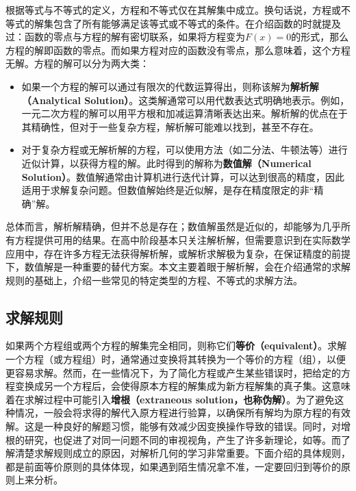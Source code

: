 
根据等式与不等式的定义，方程和不等式仅在其解集中成立。换句话说，方程或不等式的解集包含了所有能够满足该等式或不等式的条件。在介绍函数的时就提及过：函数的零点与方程的解有密切联系，如果将方程变为$F(x)=0$的形式，那么方程的解即函数的零点。而如果方程对应的函数没有零点，那么意味着，这个方程无解。方程的解可以分为两大类：

\begin{itemize}
\item 如果一个方程的解可以通过有限次的代数运算得出，则称该解为\textbf{解析解（Analytical Solution）}。这类解通常可以用代数表达式明确地表示。例如，一元二次方程的解可以用平方根和加减运算清晰表达出来。解析解的优点在于其精确性，但对于一些复杂方程，解析解可能难以找到，甚至不存在。
\item 对于复杂方程或无解析解的方程，可以使用方法（如二分法、牛顿法等）进行近似计算，以获得方程的解。此时得到的解称为\textbf{数值解（Numerical Solution）}。数值解通常由计算机进行迭代计算，可以达到很高的精度，因此适用于求解复杂问题。但数值解始终是近似解，是存在精度限定的非“精确”解。
\end{itemize}

总体而言，解析解精确，但并不总是存在；数值解虽然是近似的，却能够为几乎所有方程提供可用的结果。在高中阶段基本只关注解析解，但需要意识到在实际数学应用中，存在许多方程无法获得解析解，或解析求解极为复杂，在保证精度的前提下，数值解是一种重要的替代方案。本文主要着眼于解析解，会在介绍通常的求解规则的基础上，介绍一些常见的特定类型的方程、不等式的求解方法。

\subsection{求解规则}

如果两个方程组或两个方程的解集完全相同，则称它们\textbf{等价（equivalent）}。求解一个方程（或方程组）时，通常通过变换将其转换为一个等价的方程（组），以便更容易求解。然而，在一些情况下，为了简化方程或产生某些错误时，把给定的方程变换成另一个方程后，会使得原本方程的解集成为新方程解集的真子集。这意味着在求解过程中可能引入\textbf{增根（extraneous solution，也称伪解）}。为了避免这种情况，一般会将求得的解代入原方程进行验算，以确保所有解均为原方程的有效解。这是一种良好的解题习惯，能够有效减少因变换操作导致的错误。同时，对增根的研究，也促进了对同一问题不同的审视视角，产生了许多新理论，如等。而了解清楚求解规则成立的原因，对解析几何的学习非常重要。下面介绍的具体规则，都是前面等价原则的具体体现，如果遇到陌生情况拿不准，一定要回归到等价的原则上来分析。

